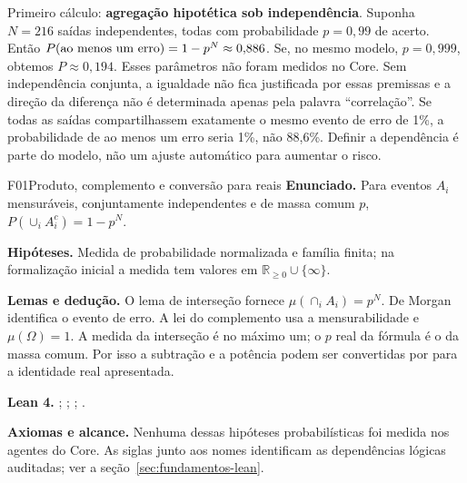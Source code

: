 Primeiro cálculo: \textbf{agregação hipotética sob independência}. Suponha
$N=216$ saídas independentes, todas com probabilidade $p=0{,}99$ de acerto.
Então $P(\hbox{ao menos um erro})=1-p^N\approx0{,}886$. Se, no mesmo
modelo, $p=0{,}999$, obtemos $P\approx0{,}194$. Esses parâmetros não foram
medidos no Core. Sem independência conjunta, a igualdade não fica justificada por essas premissas e a direção da
diferença não é determinada apenas pela palavra ``correlação''. Se todas
as saídas compartilhassem exatamente o mesmo evento de erro de 1\%, a
probabilidade de ao menos um erro seria 1\%, não 88,6\%. Definir a dependência
é parte do modelo, não um ajuste automático para aumentar o risco.
\begin{formalizacao}{F01}{Produto, complemento e conversão para reais}
\textbf{Enunciado.} Para eventos $A_i$ mensuráveis, conjuntamente independentes e de massa comum $p$, $P(\cup_i A_i^c)=1-p^N$.

\textbf{Hipóteses.} Medida de probabilidade normalizada e família finita; na formalização inicial a medida tem valores em $\mathbb{R}_{\geq0}\cup\{\infty\}$.

\textbf{Lemas e dedução.} O lema de interseção fornece $\mu(\cap_i A_i)=p^N$. De Morgan identifica o evento de erro. A lei do complemento usa a mensurabilidade e $\mu(\Omega)=1$. A medida da interseção é no máximo um; o $p$ real da fórmula é o  da massa comum. Por isso a subtração e a potência podem ser convertidas por  para a identidade real apresentada.

\textbf{Lean 4.} ; ; ; .

\textbf{Axiomas e alcance.} Nenhuma dessas hipóteses probabilísticas foi medida nos agentes do Core. As siglas junto aos nomes identificam as dependências lógicas auditadas; ver a seção~\ref{sec:fundamentos-lean}.
\end{formalizacao}

